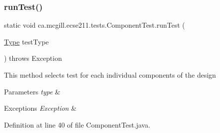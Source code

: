 \mbox{\label{enumca_1_1mcgill_1_1ecse211_1_1tests_1_1_component_test_a5dc8bf97bc48adf5bee88d425a1a974e}} 
\subsubsection{\texorpdfstring{run\+Test()}{runTest()}}
{\footnotesize\ttfamily static void ca.\+mcgill.\+ecse211.\+tests.\+Component\+Test.\+run\+Test (\begin{DoxyParamCaption}\item[{\hyperlink{enumca_1_1mcgill_1_1ecse211_1_1tests_1_1_component_test_1_1_type}{Type}}]{test\+Type }\end{DoxyParamCaption}) throws Exception\hspace{0.3cm}{\ttfamily [static]}}

This method selects test for each individual components of the design


\begin{DoxyParams}{Parameters}
{\em type} & \\
\hline
\end{DoxyParams}

\begin{DoxyExceptions}{Exceptions}
{\em Exception} & \\
\hline
\end{DoxyExceptions}


Definition at line 40 of file Component\+Test.\+java.



